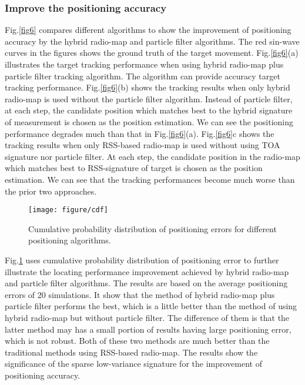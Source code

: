 \documentclass[conference, 10pt]{IEEEtran}
\begin{document}
\subsubsection{Improve the positioning accuracy}
Fig.\ref{fig6} compares different algorithms to show the improvement of positioning accuracy by the hybrid radio-map and particle filter algorithms. The red sin-wave  curves in the figures shows the ground truth of the target movement.  Fig.\ref{fig6}(a) illustrates the target tracking performance when using hybrid radio-map plus particle filter tracking algorithm. The algorithm can provide accuracy target tracking performance. Fig.\ref{fig6}(b) shows the tracking results when only hybrid radio-map is used without the particle filter algorithm.  Instead of particle filter, at each step, the candidate position which matches best to the hybrid signature of measurement is chosen as the position estimation. We can see the positioning performance degrades much than that in Fig.\ref{fig6}(a). Fig.\ref{fig6}c shows the tracking results when only RSS-based radio-map is used without using TOA signature nor particle filter. At each step, the candidate position in the radio-map which matches best to RSS-signature of target is chosen as the position estimation. We can see that the tracking performances become much worse than the prior two approaches. 
\begin{figure}[htbp]
\begin{center}
\texttt{[image: figure/cdf]}
\caption{Cumulative probability distribution of positioning errors for different positioning algorithms.}
\label{cdf}
\end{center}
\end{figure}

Fig.\ref{cdf} uses cumulative probability distribution of positioning error to further illustrate the locating performance improvement achieved by hybrid radio-map and particle filter  algorithms.  The results are based on the average positioning errors of 20 simulations. It show that the method of hybrid radio-map plus particle filter performs the best, which is a little better than the method of using hybrid radio-map but without particle filter. The difference of them is that the latter method may has a small portion of results having large positioning error, which is not robust. Both of these two methods are much better than the traditional methods using RSS-based radio-map.  The results show the significance of the sparse low-variance signature for the improvement of positioning accuracy. 
\end{document}
